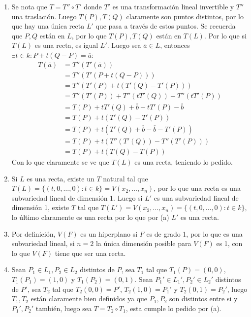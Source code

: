 \begin{sol}{2.15}
    \begin{enumerate}
        \item Se nota que \(T=T''\circ T'\) donde \(T'\) es una transformación lineal invertible y \(T''\) una traslación. Luego \(T(P),T(Q)\) claramente son puntos distintos, por lo que hay una única recta \(L'\) que pasa a través de estos puntos. Se recuerda que \(P,Q\) están en \(L\), por lo que \(T(P),T(Q)\) están en \(T(L)\). Por lo que si \(T(L)\) es una recta, es igual \(L'\). Luego sea \(\overline{a}\in L\), entonces \(\exists t\in k:P+t(Q-P)=\overline{a}\):
              \begin{align*}
                  T(\overline{a}) & =T''(T'(\overline{a}))                         \\
                                  & =T''(T'(P+t(Q-P)))                             \\
                                  & =T''(T'(P)+t(T'(Q)-T'(P)))                     \\
                                  & =T''(T'(P))+T''(tT'(Q))-T''(tT'(P))            \\
                                  & =T(P)+tT'(Q)+\overline{b}-tT'(P)-\overline{b}  \\
                                  & =T(P)+t(T'(Q)-T'(P))                           \\
                                  & =T(P)+t(T'(Q)+\overline{b}-\overline{b}-T'(P)) \\
                                  & =T(P)+t(T''(T'(Q))-T''(T'(P)))                 \\
                                  & =T(P)+t(T(Q)-T(P))
              \end{align*}
              Con lo que claramente se ve que \(T(L)\) es una recta, teniendo lo pedido.
        \item Si \(L\) es una recta, existe un \(T\) natural tal que \(T(L)=\{(t,0,\dots,0):t\in k\}=V(x_2,\dots,x_n)\), por lo que una recta es una subvariedad lineal de dimensión 1. Luego si \(L'\) es una subvariedad lineal de dimensión 1, existe \(T\) tal que \(T(L')=V(x_2,\dots,x_n)=\{(t,0,\dots,0):t\in k\}\), lo último claramente es una recta por lo que por (a) \(L'\) es una recta.
        \item Por definición, \(V(F)\) es un hiperplano si \(F\) es de grado 1, por lo que es una subvariedad lineal, si \(n=2\) la única dimensión posible para \(V(F)\) es 1, con lo que \(V(F)\) tiene que ser una recta.
        \item Sean \(P_1\in L_1,P_2\in L_2\) distintos de \(P\), sea \(T_1\) tal que \(T_1(P)=(0,0)\),  \(T_1(P_1)=(1,0)\) y \(T_1(P_2)=(0,1)\). Sean \(P_1'\in L_1',P_2'\in L_2'\) distintos de \(P'\), sea \(T_2\) tal que \(T_2(0,0)=P'\), \(T_2(1,0)=P_1'\) y \(T_2(0,1)=P_2'\), luego \(T_1,T_2\) están claramente bien definidos ya que \(P_1, P_2\) son distintos entre si y \(P_1',P_2'\) también, luego sea \(T=T_2\circ T_1\), esta cumple lo pedido por (a).
    \end{enumerate}
\end{sol}

